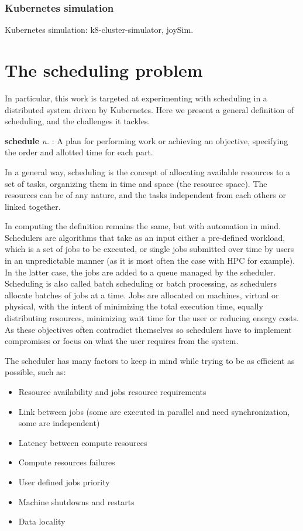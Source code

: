 \documentclass[12pt, a4paper]{memoir}
\begin{document}
\subsubsection{Kubernetes simulation}

Kubernetes simulation: k8-cluster-simulator, joySim.


\section{The scheduling problem}

In particular, this work is targeted at experimenting with scheduling in a
distributed system driven by Kubernetes. Here we present a general definition
of scheduling, and the challenges it tackles.

\begin{displayquote}[][]
	\textbf{schedule} \textit{n.} : A plan for
	performing work or achieving an objective, specifying the order and
	allotted time for each part.
\end{displayquote}

In a general way, scheduling is the concept of allocating available resources
to a set of tasks, organizing them in time and space (the resource space). The
resources can be of any nature, and the tasks independent from each others or
linked together.

In computing the definition remains the same, but with automation in mind.
Schedulers are algorithms that take as an input either a pre-defined workload,
which is a set of jobs  to be executed, or single jobs submitted over time by
users in an unpredictable manner (as it is most often the case with HPC for
example). In the latter case, the jobs are added to a queue managed by the
scheduler. Scheduling is also called batch scheduling or batch processing, as
schedulers allocate batches of jobs at a time. Jobs are allocated on machines,
virtual or physical, with the intent of minimizing the total execution time,
equally distributing resources, minimizing wait time for the user or reducing
energy costs. As these objectives often contradict themselves so schedulers have
to implement compromises or focus on what the user requires from the system.

The scheduler has many factors to keep in mind while trying to be as efficient
as possible, such as:

\begin{itemize}
	\item Resource availability and jobs resource requirements
	\item Link between jobs (some are executed in parallel and need synchronization, some are independent)
	\item Latency between compute resources
	\item Compute resources failures
	\item User defined jobs priority
	\item Machine shutdowns and restarts
	\item Data locality
\end{itemize}
\end{document}
